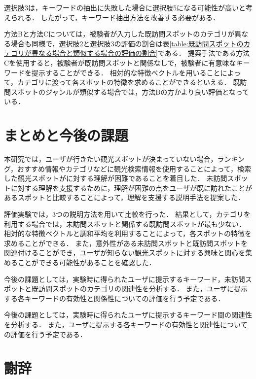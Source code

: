 \documentclass{deimj}
\begin{document}
選択肢3は，キーワードの抽出に失敗した場合に選択肢5になる可能性が高いと考えられる．
したがって，キーワード抽出方法を改善する必要がある．

方法Bと方法Cについては，被験者が入力した既訪問スポットのカテゴリが異なる場合も同様で，選択肢2と選択肢3の評価の割合は表\ref{table:既訪問スポットのカテゴリが異なる場合と類似する場合の評価の割合}である．
提案手法である方法Cを使用すると，被験者が既訪問スポットと関係なしで，被験者に有意味なキーワードを提示することができる．
相対的な特徴ベクトルを用いることによって，カテゴリに渡って各スポットの特徴を求めることができるといえる．
既訪問スポットのジャンルが類似する場合では，方法Bの方かより良い評価となっている．

\section{まとめと今後の課題}
\label{sec:まとめと今後の課題}

本研究では，ユーザが行きたい観光スポットが決まっていない場合，ランキング，おすすめ情報やカテゴリなどに観光検索情報を使用することによって，検索した観光スポットがに対する理解が困難であることを着目した．
未訪問スポットに対する理解を支援するために，理解が困難の点をユーザが既に訪れたことがあるスポットと比較することによって，理解を支援する説明手法を提案した．

評価実験では，3つの説明方法を用いて比較を行った．
結果として，カテゴリを利用する場合では，未訪問スポットと関係する既訪問スポットが最も少ない．
相対的な特徴ベクトルと調和平均を利用することによって，各スポットの特徴を求めることができる．
また，意外性がある未訪問スポットと既訪問スポットを関連付けることができ，ユーザが知らない観光スポットに対する興味と関心を集めることができる可能性があることを確認した．

今後の課題としては，実験時に得られたユーザに提示するキーワード，未訪問スポットと既訪問スポットのカテゴリの関連性を分析する．
また，ユーザに提示する各キーワードの有効性と関係性についての評価を行う予定である．

今後の課題としては，実験時に得られたユーザに提示するキーワード間の関連性を分析する．
また，ユーザに提示する各キーワードの有効性と関連性についての評価を行う予定である．

\section*{謝辞}
\end{document}
